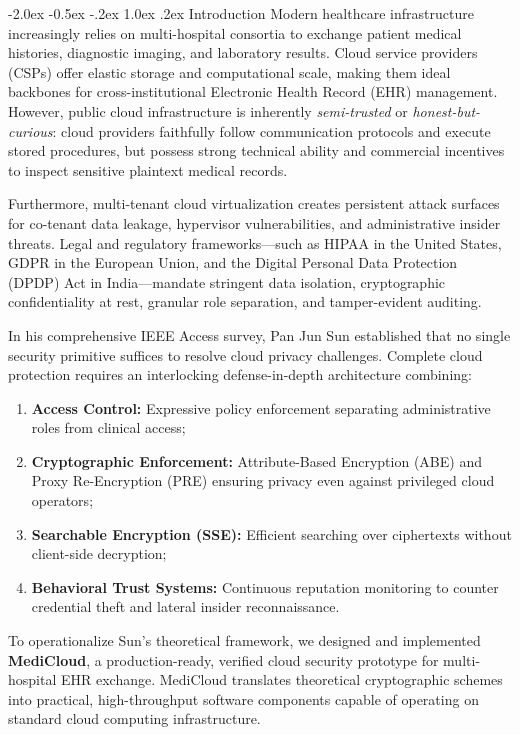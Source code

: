 \documentclass[10pt,twocolumn]{article}
\makeatletter
\renewcommand\section{\@startsection {section}{1}{\z@}%
  {-2.0ex \@plus -0.5ex \@minus -.2ex}%
  {1.0ex \@plus .2ex}%
  {\normalfont\normalsize\bfseries\scshape\color{primary}}}
\makeatother
\begin{document}
\section{Introduction}
Modern healthcare infrastructure increasingly relies on multi-hospital consortia to exchange patient medical histories, diagnostic imaging, and laboratory results. Cloud service providers (CSPs) offer elastic storage and computational scale, making them ideal backbones for cross-institutional Electronic Health Record (EHR) management. However, public cloud infrastructure is inherently \textit{semi-trusted} or \textit{honest-but-curious}: cloud providers faithfully follow communication protocols and execute stored procedures, but possess strong technical ability and commercial incentives to inspect sensitive plaintext medical records. 

Furthermore, multi-tenant cloud virtualization creates persistent attack surfaces for co-tenant data leakage, hypervisor vulnerabilities, and administrative insider threats. Legal and regulatory frameworks---such as HIPAA in the United States, GDPR in the European Union, and the Digital Personal Data Protection (DPDP) Act in India---mandate stringent data isolation, cryptographic confidentiality at rest, granular role separation, and tamper-evident auditing.

In his comprehensive IEEE Access survey, Pan Jun Sun \cite{sun2019privacy} established that no single security primitive suffices to resolve cloud privacy challenges. Complete cloud protection requires an interlocking defense-in-depth architecture combining:
\begin{enumerate}
    \item \textbf{Access Control:} Expressive policy enforcement separating administrative roles from clinical access;
    \item \textbf{Cryptographic Enforcement:} Attribute-Based Encryption (ABE) and Proxy Re-Encryption (PRE) ensuring privacy even against privileged cloud operators;
    \item \textbf{Searchable Encryption (SSE):} Efficient searching over ciphertexts without client-side decryption;
    \item \textbf{Behavioral Trust Systems:} Continuous reputation monitoring to counter credential theft and lateral insider reconnaissance.
\end{enumerate}

To operationalize Sun's theoretical framework, we designed and implemented \textbf{MediCloud}, a production-ready, verified cloud security prototype for multi-hospital EHR exchange. MediCloud translates theoretical cryptographic schemes into practical, high-throughput software components capable of operating on standard cloud computing infrastructure.
\end{document}
